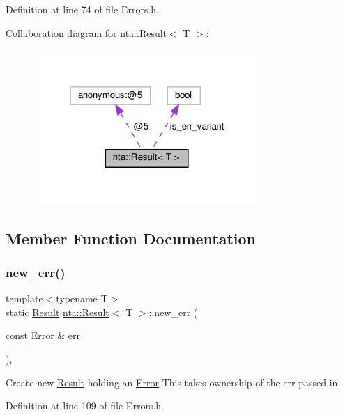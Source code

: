Definition at line 74 of file Errors.\+h.



Collaboration diagram for nta\+:\+:Result$<$ T $>$\+:\nopagebreak
\begin{figure}[H]
\begin{center}
\leavevmode
\includegraphics[width=246pt]{d6/da5/classnta_1_1Result__coll__graph}
\end{center}
\end{figure}


\subsection{Member Function Documentation}
\mbox{\label{classnta_1_1Result_ad65a9140ae2a03cfb13bd30f848b1aa5}} 
\subsubsection{\texorpdfstring{new\+\_\+err()}{new\_err()}}
{\footnotesize\ttfamily template$<$typename T$>$ \\
static \hyperlink{classnta_1_1Result}{Result} \hyperlink{classnta_1_1Result}{nta\+::\+Result}$<$ T $>$\+::new\+\_\+err (\begin{DoxyParamCaption}\item[{const \hyperlink{structnta_1_1Error}{Error} \&}]{err }\end{DoxyParamCaption})\hspace{0.3cm}{\ttfamily [inline]}, {\ttfamily [static]}}

Create new \hyperlink{classnta_1_1Result}{Result} holding an \hyperlink{structnta_1_1Error}{Error} This takes ownership of the err passed in 

Definition at line 109 of file Errors.\+h.



